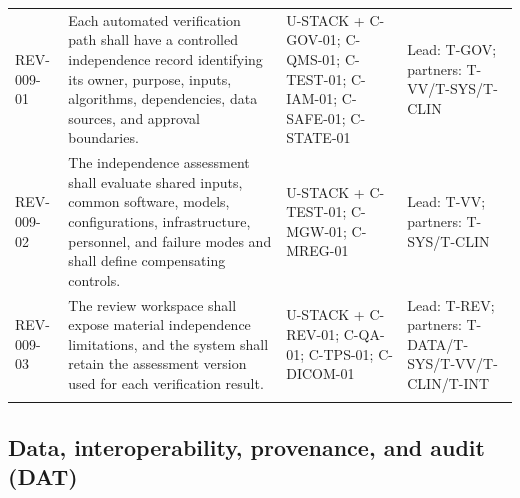 \documentclass[11pt,letterpaper]{article}
\begin{document}
\begin{scriptsize}
\begin{longtable}{@{}L{0.115\textwidth}L{0.345\textwidth}L{0.265\textwidth}L{0.195\textwidth}@{}}
\addlinespace[2pt]
\mbox{REV-009-01} & Each automated verification path shall have a controlled independence record identifying its owner, purpose, inputs, algorithms, dependencies, data sources, and approval boundaries. & U-STACK + C-GOV-01; C-QMS-01; C-TEST-01; C-IAM-01; C-SAFE-01; C-STATE-01 & Lead: T-GOV; partners: T-VV\slash\allowbreak{}T-SYS\slash\allowbreak{}T-CLIN \\
\addlinespace[2pt]
\mbox{REV-009-02} & The independence assessment shall evaluate shared inputs, common software, models, configurations, infrastructure, personnel, and failure modes and shall define compensating controls. & U-STACK + C-TEST-01; C-MGW-01; C-MREG-01 & Lead: T-VV; partners: T-SYS\slash\allowbreak{}T-CLIN \\
\addlinespace[2pt]
\mbox{REV-009-03} & The review workspace shall expose material independence limitations, and the system shall retain the assessment version used for each verification result. & U-STACK + C-REV-01; C-QA-01; C-TPS-01; C-DICOM-01 & Lead: T-REV; partners: T-DATA\slash\allowbreak{}T-SYS\slash\allowbreak{}T-VV\slash\allowbreak{}T-CLIN\slash\allowbreak{}T-INT \\
\addlinespace[2pt]
\end{longtable}
\end{scriptsize}

\subsection{Data, interoperability, provenance, and audit (DAT)}
\end{document}
